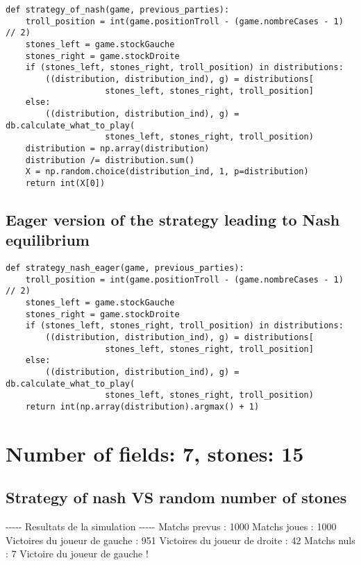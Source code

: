 \documentclass{article}%
\begin{document}
\begin{verbatim}
def strategy_of_nash(game, previous_parties):
	troll_position = int(game.positionTroll - (game.nombreCases - 1) // 2)
	stones_left = game.stockGauche
	stones_right = game.stockDroite
	if (stones_left, stones_right, troll_position) in distributions:
		((distribution, distribution_ind), g) = distributions[
					stones_left, stones_right, troll_position]
	else:
		((distribution, distribution_ind), g) = db.calculate_what_to_play(
					stones_left, stones_right, troll_position)
	distribution = np.array(distribution)
	distribution /= distribution.sum()
	X = np.random.choice(distribution_ind, 1, p=distribution)
	return int(X[0])
\end{verbatim}

\subsection{Eager version of the strategy leading to Nash equilibrium}

\begin{verbatim}
def strategy_nash_eager(game, previous_parties):
	troll_position = int(game.positionTroll - (game.nombreCases - 1) // 2)
	stones_left = game.stockGauche
	stones_right = game.stockDroite
	if (stones_left, stones_right, troll_position) in distributions:
		((distribution, distribution_ind), g) = distributions[
					stones_left, stones_right, troll_position]
	else:
		((distribution, distribution_ind), g) = db.calculate_what_to_play(
					stones_left, stones_right, troll_position)
	return int(np.array(distribution).argmax() + 1)
\end{verbatim}

\section{Number of fields: 7, stones: 15}%
\label{sec:Number of fields 7, stones 15}%
\subsection{Strategy of nash VS random number of stones}%
\label{subsec:Strategy of nash VS random number of stones}%
{-}{-}{-}{-}{-} Resultats de la simulation {-}{-}{-}{-}{-}\newline%
		\newline%
Matchs prevus : 1000\newline%
Matchs joues : 1000\newline%
\newline%
Victoires du joueur de gauche : 951\newline%
Victoires du joueur de droite : 42\newline%
Matchs nuls : 7\newline%
\newline%
Victoire du joueur de gauche !
\end{document}
